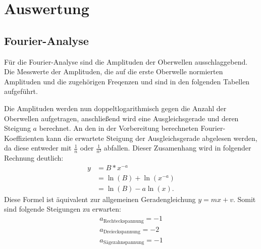 \section{Auswertung}
\label{sec:Auswertung}
\subsection{Fourier-Analyse}
Für die Fourier-Analyse sind die Amplituden der Oberwellen ausschlaggebend.
Die Messwerte der Amplituden, die auf die erste Oberwelle normierten Amplituden
und die zugehörigen Freqenzen und sind in den folgenden Tabellen aufgeführt.



Die Amplituden werden nun doppeltlogarithmisch gegen die Anzahl der Oberwellen
aufgetragen, anschließend wird eine Ausgleichsgerade und deren Steigung $a$ berechnet.
An den in der Vorbereitung berechneten Fourier-Koeffizienten
kann die erwartete Steigung der Ausgleichsgerade abgelesen werden, da diese
entweder mit $\frac{1}{n}$ oder $\frac{1}{n²}$ abfallen. Dieser
Zusamenhang wird in folgender Rechnung deutlich:
\begin{align*}
  y &= B*x^{-a}\\
    &= \ln(B)+\ln(x^{-a})\\
    &= \ln(B)-a\ln(x).
\end{align*}
Diese Formel ist äquivalent zur allgemeinen Geradengleichung $y=mx+v$.
Somit sind folgende Steigungen zu erwarten: \\

\begin{align*}
  a_{\text{Rechteckspannung}} = -1 \\
  a_{\text{Dreieckspannung}} = -2  \\
  a_{\text{Sägezahnspannung}} = -1
\end{align*}

